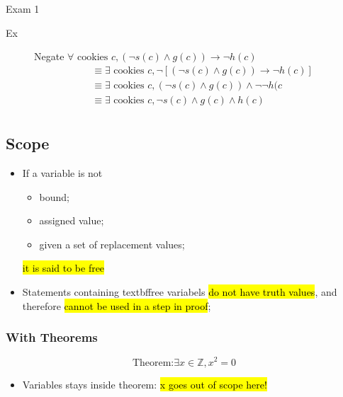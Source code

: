 \documentclass{note}
\begin{document}
\begin{note}{Exam 1}
        \begin{description}
            \item[Ex] Negate $ \forall \text{ cookies } c, \left( \neg s \left(c\right) \wedge g \left(c\right) \right) \to \neg h \left(c\right) $
            \begin{align*}
                &\equiv \exists \text{ cookies } c, \neg \left[ \left( \neg s (c) \wedge g (c) \right) \to \neg h (c) \right]\\
                &\equiv \exists \text{ cookies } c, \left( \neg s (c) \wedge g (c) \right) \wedge \neg \neg h (c\\
                &\equiv \exists \text{ cookies } c, \neg s (c) \wedge g (c) \wedge h (c)\\
            \end{align*}
        \end{description}

        \subsection{Scope}

        \begin{itemize}
            \item If a variable is not 
            \begin{itemize}
                \item bound;
                \item assigned value;
                \item given a set of replacement values;
            \end{itemize}
            \hl{it is said to be free}

            \item Statements containing textbf{free} variabels \hl{do not have truth values},
            and therefore \hl{cannot be used in a step in proof};
        \end{itemize}

        \subsubsection{With Theorems}

        \begin{displaymath}
            \text{Theorem:} \exists x \in \mathbb{Z}, x^{2} = 0
        \end{displaymath}

        \begin{itemize}
            \item Variables stays inside theorem: \hl{x goes out of scope here!}
        \end{itemize}


\end{note}
\end{document}
